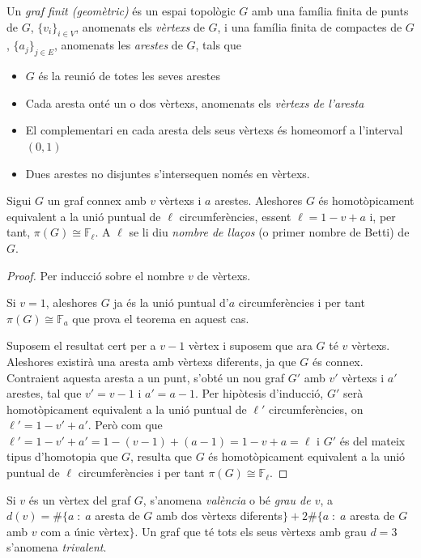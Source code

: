 \documentclass[../main.tex]{subfiles}
\begin{document}
\begin{defi}
[Graf]\label{def:graf} Un \textit{graf finit (geomètric)} és un espai topològic $G$ amb una família finita de punts de $G$, $\{v_i\}_{i\in V}$, anomenats els \textit{vèrtexs} de $G$, i una família finita de compactes de $G$, $\{a_j\}_{j\in E}$, anomenats les \textit{arestes} de $G$, tals que
\begin{itemize}
    \item $G$ és la reunió de totes les seves arestes
    \item Cada aresta onté un o dos vèrtexs, anomenats els \textit{vèrtexs de l'aresta}
    \item El complementari en cada aresta dels seus vèrtexs és homeomorf a l'interval $(0,1)$
    \item Dues arestes no disjuntes s'intersequen només en vèrtexs.
\end{itemize}
\end{defi}

\begin{ter}
\label{ter:numerodebetti} Sigui $G$ un graf connex amb $v$ vèrtexs i $a$ arestes. Aleshores $G$ és homotòpicament equivalent a la unió puntual de $\ell$ circumferències, essent $\ell = 1-v+a$ i, per tant, $\pi(G)\cong \mathbb{F}_\ell$. A $\ell$ se li diu \textit{nombre de llaços} (o primer nombre de Betti) de $G$.
\end{ter}
\begin{proof}
Per inducció sobre el nombre $v$ de vèrtexs. 

Si $v = 1$, aleshores $G$ ja és la unió puntual d'$a$ circumferències i per tant $\pi(G)\cong \mathbb{F}_a$ que prova el teorema en aquest cas.

Suposem el resultat cert per a $v-1$ vèrtex i suposem que ara $G$ té $v$ vèrtexs. Aleshores existirà una aresta amb vèrtexs diferents, ja que $G$ és connex. Contraient aquesta aresta a un punt, s'obté un nou graf $G'$ amb $v'$ vèrtexs i $a'$ arestes, tal que $v' = v-1$ i $a' = a-1$. Per hipòtesis d'inducció, $G'$ serà homotòpicament equivalent a la unió puntual de $\ell'$ circumferències, on $\ell' = 1-v'+a'$. Però com que $\ell' = 1-v'+a'=1-(v-1)+(a-1)=1-v+a=\ell$ i $G'$ és del mateix tipus d'homotopia que $G$, resulta que $G$ és homotòpicament equivalent a la unió puntual de $\ell$ circumferències i per tant $\pi(G)\cong \mathbb{F}_\ell$.
\end{proof}
\begin{defi}
\label{def:valencia} Si $v$ és un vèrtex del graf $G$, s'anomena \textit{valència} o bé \textit{grau de $v$}, a $d(v) = \#\{a\;:\;a$ aresta de $G$ amb dos vèrtexs diferents$\}+2\#\{a\;:\;a$ aresta de $G$ amb $v$ com a únic vèrtex$\}$. Un graf que té tots els seus vèrtexs amb grau $d = 3$ s'anomena \textit{trivalent}\label{def:graftrivalent}.
\end{defi}
\end{document}
